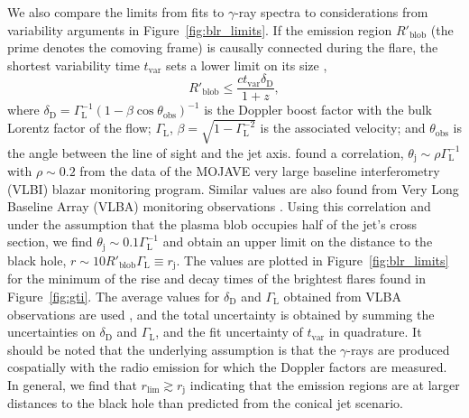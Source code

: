 \documentclass[twocolumn]{aastex62}
\newcommand{\Grays}{$\gamma$-rays\xspace}
\newcommand{\gray}{$\gamma$-ray\xspace}
\begin{document}
We also compare the limits from fits to \gray spectra to considerations from variability arguments in Figure~\ref{fig:blr_limits}.
If the emission region $R'_\mathrm{blob}$ (the prime denotes the comoving frame) is causally connected during the flare, the shortest variability time $t_\mathrm{var}$ sets a lower limit on its size \citep[e.g.,][]{2008MNRAS.384L..19B},
\begin{equation}
    R'_\mathrm{blob} \leqslant \frac{ct_\mathrm{var}\delta_\mathrm{D}}{1+z},
    \label{eq:rblob}
\end{equation}
where $\delta_\mathrm{D} = \Gamma^{-1}_\mathrm{L}(1 - \beta\cos\theta_\mathrm{obs})^{-1}$ is the Doppler boost factor with the bulk Lorentz factor of the flow; $\Gamma_\mathrm{L}$, $\beta = \sqrt{1 - \Gamma_\mathrm{L}^{-2}}$ is the associated velocity; and $\theta_\mathrm{obs} $ is the angle between the line of sight and the jet axis.
\citet{2013A&A...558A.144C} found a correlation, 
$\theta_\mathrm{j} \sim \rho\Gamma^{-1}_\mathrm{L}$ with $\rho \sim 0.2$ from the data of the MOJAVE very large baseline interferometry (VLBI) blazar monitoring program.
Similar values are also found from Very Long Baseline Array (VLBA) monitoring observations \citep{2017ApJ...846...98J}.
Using this correlation and under the assumption that the plasma blob occupies half of the jet's cross section, we find 
$\theta_\mathrm{j} \sim 0.1\Gamma^{-1}_\mathrm{L}$ and obtain
an upper limit on the distance to the black hole, $r \sim 10R'_\mathrm{blob}\Gamma_\mathrm{L} \equiv r_\mathrm{j}$.
The values are plotted in Figure~\ref{fig:blr_limits} for the minimum of the rise and decay times of the brightest flares found in Figure~\ref{fig:gti}.
The average values for $\delta_\mathrm{D}$ and $\Gamma_\mathrm{L}$ obtained from VLBA  observations are used \citep[see also Table~\ref{tab:src-select}]{2017ApJ...846...98J},  and the total  uncertainty is obtained by summing the uncertainties on $\delta_\mathrm{D}$ and $\Gamma_\mathrm{L}$, and the fit uncertainty of $t_\mathrm{var}$ in quadrature.
It should be noted that the underlying assumption is that the \Grays are produced cospatially with the radio emission for which the Doppler factors are measured.  
In general, we find that $r_\mathrm{lim} \gtrsim r_\mathrm{j}$ indicating that the emission regions are at larger distances to the black hole than predicted from the conical jet scenario.  
\end{document}
